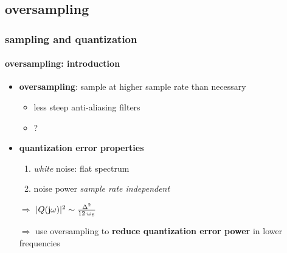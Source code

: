 \subsection{oversampling}
	\begin{frame}\frametitle{sampling and quantization}\framesubtitle{oversampling: introduction}
		\begin{itemize}
            \item   \textbf{oversampling}: sample at higher sample rate than necessary
            \begin{itemize}
                \item	less steep anti-aliasing filters
                \item	?
            \end{itemize}
            \pause
			\item	\textbf{quantization error properties}
			\begin{enumerate}
				\item	\textit{white} noise: flat spectrum
				\item	noise power \textit{sample rate independent}
			\end{enumerate}
            \pause
            \bigskip
			\item[$\Rightarrow$] 
			$|Q(\mathrm{j}\omega)|^2 \sim \frac{\Delta^2}{12\cdot \omega_\mathrm{S}}$
            \pause
            \bigskip
			\item[$\Rightarrow$] use oversampling to \textbf{reduce quantization error power }in lower frequencies
		\end{itemize}
	\end{frame}	
